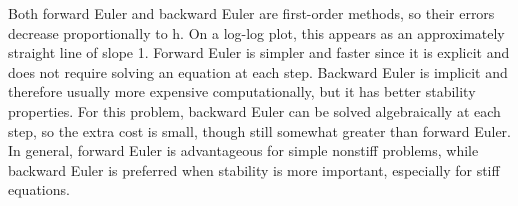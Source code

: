 \documentclass[12pt]{amsart}
\begin{document}
\begin{onehalfspace}
        Both forward Euler and backward Euler are first-order methods, so their errors decrease proportionally to h. On a
        log-log plot, this appears as an approximately straight line of slope 1. Forward Euler is simpler and faster
        since it is explicit and does not require solving an equation at each step. Backward Euler is implicit and
        therefore usually more expensive computationally, but it has better stability properties. For this problem,
        backward Euler can be solved algebraically at each step, so the extra cost is small, though still somewhat
        greater than forward Euler. In general, forward Euler is advantageous for simple nonstiff problems, while
        backward Euler is preferred when stability is more important, especially for stiff equations.



    \end{onehalfspace}
\end{document}
